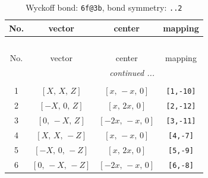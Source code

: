 \documentclass[fleqn,8pt]{jsarticle}
\begin{document}
\begin{longtable}{cccc}
\caption{Wyckoff bond: {\tt 6f@3b}, bond symmetry: {\tt ..2}}
 \\
 \hline \hline
No. & vector & center & mapping \\ \hline \endfirsthead

\multicolumn{3}{l}{\tablename\ \thetable{}} \\
 \hline \hline
No. & vector & center & mapping \\ \hline \endhead

 \hline \hline
\multicolumn{3}{r}{\footnotesize\it continued ...} \\ \endfoot

 \hline \hline
\multicolumn{3}{r}{} \\ \endlastfoot

1 & $\left[ X,\, X,\, Z \right]$ & $\left[ x,\, - x,\, 0 \right]$ & {\tt [1,-10]} \\ \hline
2 & $\left[ - X,\, 0,\, Z \right]$ & $\left[ x,\, 2 x,\, 0 \right]$ & {\tt [2,-12]} \\ \hline
3 & $\left[ 0,\, - X,\, Z \right]$ & $\left[ - 2 x,\, - x,\, 0 \right]$ & {\tt [3,-11]} \\ \hline
4 & $\left[ X,\, X,\, - Z \right]$ & $\left[ x,\, - x,\, 0 \right]$ & {\tt [4,-7]} \\ \hline
5 & $\left[ - X,\, 0,\, - Z \right]$ & $\left[ x,\, 2 x,\, 0 \right]$ & {\tt [5,-9]} \\ \hline
6 & $\left[ 0,\, - X,\, - Z \right]$ & $\left[ - 2 x,\, - x,\, 0 \right]$ & {\tt [6,-8]} \\
\end{longtable}
\renewcommand{\arraystretch}{1.2}
\end{document}

